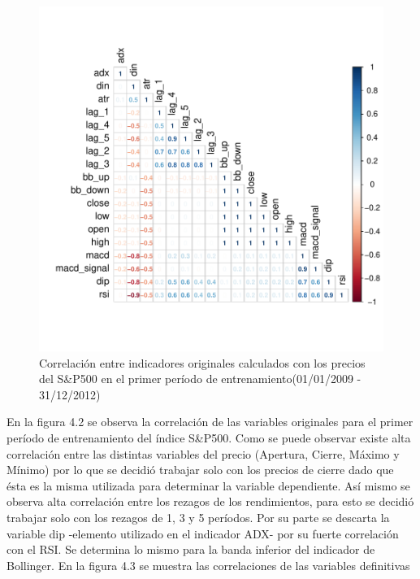 \documentclass[a4paper,12pt]{Latex/Classes/PhDthesisPSnPDF}
\begin{document}
\begin{figure}[H]
\centering
\includegraphics{main-006}
\caption{Correlación entre indicadores originales calculados con los precios del S\&P500 en el primer período de entrenamiento(01/01/2009 - 31/12/2012)}
\end{figure}

En la figura 4.2 se observa la correlación de las variables originales para el primer período de entrenamiento del índice S\&P500. Como se puede observar existe alta correlación entre las distintas variables del precio (Apertura, Cierre, Máximo y Mínimo) por lo que se decidió trabajar solo con los precios de cierre dado que ésta es la misma utilizada para determinar la variable dependiente. Así mismo se observa alta correlación entre los rezagos de los rendimientos, para esto se decidió trabajar solo con los rezagos de 1, 3 y 5 períodos. Por su parte se descarta la variable dip -elemento utilizado en el indicador ADX- por su fuerte correlación con el RSI. Se determina lo mismo para la banda inferior del indicador de Bollinger. En la figura 4.3 se muestra las correlaciones de las variables definitivas
\end{document}
